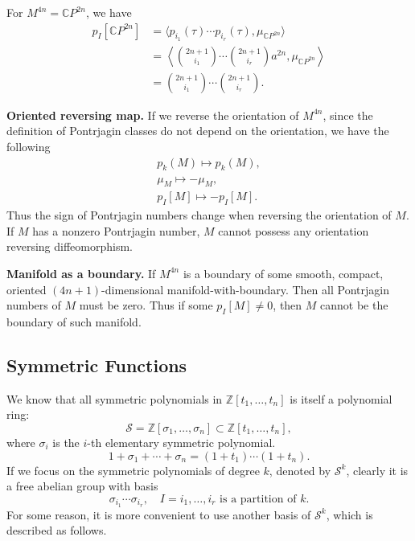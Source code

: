 \begin{example}
    For $M^{4n}=\mathbb{C}P^{2n}$, we have
    \begin{align*}
        p_I[\mathbb{C}P^{2n}] 
        &= \langle p_{i_1}(\tau)\cdots p_{i_r}(\tau),
        \mu_{\mathbb{C}P^{2n}}\rangle \\
        &=\left\langle\binom{2n+1}{i_1}\cdots\binom{2n+1}{i_r}a^{2n},
        \mu_{\mathbb{C}P^{2n}}\right\rangle \\
        &=\binom{2n+1}{i_1}\cdots\binom{2n+1}{i_r}.
    \end{align*}
\end{example}

\noindent\textbf{Oriented reversing map.} 
If we reverse the orientation of $M^{4n}$, since the definition of
Pontrjagin classes do not depend on the orientation, 
we have the following
\begin{gather*}
    p_k(M)\mapsto p_k(M), \\
    \mu_M\mapsto -\mu_M, \\
    p_I[M]\mapsto -p_I[M].
\end{gather*}
Thus the sign of Pontrjagin numbers change when 
reversing the orientation of $M$. 
If $M$ has a nonzero Pontrjagin number, 
$M$ cannot possess any orientation reversing diffeomorphism. 

\noindent\textbf{Manifold as a boundary.} 
If $M^{4n}$ is a boundary of some smooth, 
compact, oriented $(4n+1)$-dimensional manifold-with-boundary. 
Then all Pontrjagin numbers of $M$ must be zero. 
Thus if some $p_I[M]\neq0$, 
then $M$ cannot be the boundary of such manifold.

\subsection{Symmetric Functions}
We know that all symmetric polynomials in 
$\mathbb{Z}[t_1,\dots,t_n]$ is itself a polynomial ring: 
\begin{equation*}
    \mathcal{S} = \mathbb{Z}[\sigma_1,\dots,\sigma_n]\subset
    \mathbb{Z}[t_1,\dots,t_n],
\end{equation*}
where $\sigma_i$ is the $i$-th elementary symmetric polynomial.
\begin{equation*}
    1+\sigma_1+\cdots+\sigma_n = (1+t_1)\cdots(1+t_n).
\end{equation*}
If we focus on the symmetric polynomials of degree $k$, 
denoted by $\mathcal{S}^k$, clearly 
it is a free abelian group with basis
\begin{equation*}
    \sigma_{i_1}\cdots\sigma_{i_r},\quad
    I=i_1,\dots,i_r\text{ is a partition of } k.
\end{equation*}
For some reason, it is more convenient to use another basis of 
$\mathcal{S}^k$, which is described as follows.

